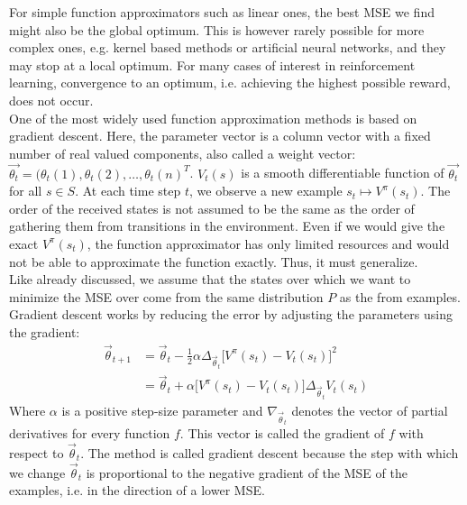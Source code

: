 \documentclass[a4paper]{article}
\begin{document}
For simple function approximators such as linear ones, the best MSE we find might also be the global optimum. This is however rarely possible for more complex ones, e.g. kernel based methods or artificial neural networks, and they may stop at a local optimum. For many cases of interest in reinforcement learning, convergence to an optimum, i.e. achieving the highest possible reward, does not occur.\\

One of the most widely used function approximation methods is based on gradient descent. Here, the parameter vector is a column vector with a fixed number of real valued components, also called a weight vector: $\overrightarrow{\theta_t} = (\theta_t(1), \theta_t(2), \dots, \theta_t(n)^T$. $V_t(s)$ is a smooth differentiable function of $\overrightarrow{\theta_t}$ for all $s \in S$. At each time step $t$, we observe a new example $s_t \mapsto V^{\pi}(s_t)$. The order of the received states is not assumed to be the same as the order of gathering them from transitions in the environment. Even if we would give the exact $V^{\pi}(s_t)$, the function approximator has only limited resources and would not be able to approximate the function exactly. Thus, it must generalize.\\
Like already discussed, we assume that the states over which we want to minimize the MSE over come from the same distribution $P$ as the from examples. 
Gradient descent works by reducing the error by adjusting the parameters using the gradient:
\begin{align}
\overrightarrow{\theta}_{t+1} &= \overrightarrow{\theta}_t - \frac{1}{2} \alpha \Delta_{\overrightarrow{\theta}_t} \big[ V^{\pi}(s_t) - V_t(s_t) \big]^2\\
&= \overrightarrow{\theta}_t + \alpha \big[ V^{\pi}(s_t) - V_t(s_t) \big] \Delta_{\overrightarrow{\theta}_t} V_t(s_t)
\end{align}
Where $\alpha$ is a positive step-size parameter and $\nabla_{\overrightarrow{\theta}_t}$ denotes the vector of partial derivatives for every function $f$. This vector is called the gradient of $f$ with respect to $\overrightarrow{\theta}_t$. The method is called gradient descent because the step with which we change $\overrightarrow{\theta}_t$ is proportional to the negative gradient of the MSE of the examples, i.e. in the direction of a lower MSE.\\
\end{document}
